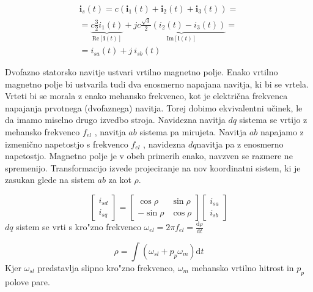 \documentclass[journal,a4paper,twoside]{sty/IEEEtran}
\begin{document}
\begin{equation}
\begin{multlined}
{\textbf{i}_s}(t)= c (\textbf{i}_1(t)+\textbf{i}_2(t)+\textbf{i}_3(t))=\\
 = \underbrace{c \frac{3}{2}i_1(t)}_{\mathrm{Re}{[\textbf{i}(t)]}}+j \underbrace{c \frac{\sqrt{3}}{2}(i_2(t)-i_3(t))}_{\mathrm{Im}{[\textbf{i}(t)]}}= \\
  = i_{sa}(t)+j\:i_{sb}(t)\qquad \qquad \qquad\qquad\quad
  \end{multlined}
\end{equation}














Dvofazno statorsko navitje ustvari vrtilno magnetno polje. Enako vrtilno magnetno polje bi
ustvarila tudi dva enosmerno napajana navitja, ki bi se vrtela. Vrteti bi se morala z enako
mehansko frekvenco, kot je električna frekvenca napajanja prvotnega (dvofaznega) navitja. Torej
dobimo ekvivalentni učinek, le da imamo miselno drugo izvedbo stroja.
Navidezna navitja $dq$ sistema se vrtijo z mehansko frekvenco $f_{el}$ , navitja $ab$ sistema pa
mirujeta. Navitja $ab$ napajamo z izmenično napetostjo s frekvenco $f_{el}$ , navidezna $dq$navitja pa
z enosmerno napetostjo. Magnetno polje je v obeh primerih enako, navzven se razmere ne
spremenijo. \cite{denis} Transformacijo izvede projeciranje na nov koordinatni sistem, ki je zasukan glede na sistem $ab$ za kot $\rho$.


\begin{equation}
\begin{bmatrix}
i_{sd}\\i_{sq}
\end{bmatrix}=
\begin{bmatrix}
\cos \rho& \sin \rho\\ -\sin\rho &\cos \rho
\end{bmatrix}
\begin{bmatrix}
i_{sa}\\i_{sb}
\end{bmatrix}
\end{equation}
$dq$ sistem se vrti s kro"zno frekvenco $\omega_{el}=2 \pi f_{el}=\frac{\mathrm{d} \rho}{\mathrm{d} t}$

\begin{equation}
\rho=\int (\omega_{sl}+p_p \omega_m)\mathrm{d}t
\end{equation}
Kjer $\omega_{sl}$ predstavlja slipno kro"zno frekvenco, $\omega_m$ mehansko vrtilno hitrost  in $p_p$ polove pare.
\end{document}

